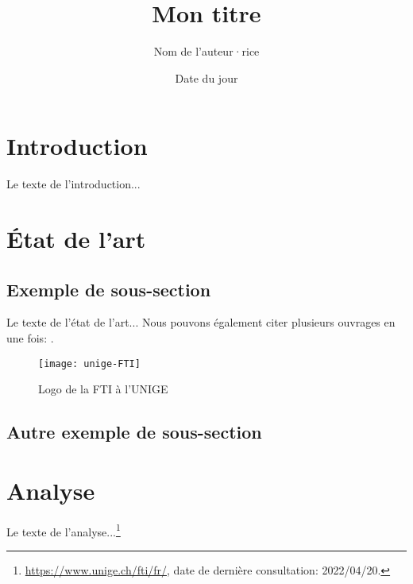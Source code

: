\documentclass[a4paper,12pt]{article} %
\title{Mon titre} %
\author{Nom de l'auteur·rice} %
\date{Date du jour} %
\begin{document}
\maketitle %

\section{Introduction} %
Le texte de l'introduction... \cite{van2016introduction} %

\section{État de l'art} %
\subsection{Exemple de sous-section}
Le texte de l'état de l'art... \cite[p. 123]{tahmasebi2019strengths} %
Nous pouvons également citer plusieurs ouvrages en une fois: \cite{hill2019quantifying,verborgh2013using,de2017semantic}.

\begin{figure}[h] %
  \centering %
  \texttt{[image: unige-FTI]} %
  \caption{Logo de la FTI à l'UNIGE} %
\end{figure}

\subsection{Autre exemple de sous-section}

\section{Analyse} %
Le texte de l'analyse...\footnote{\url{https://www.unige.ch/fti/fr/}, date de dernière consultation: 2022/04/20.} %
\end{document}
